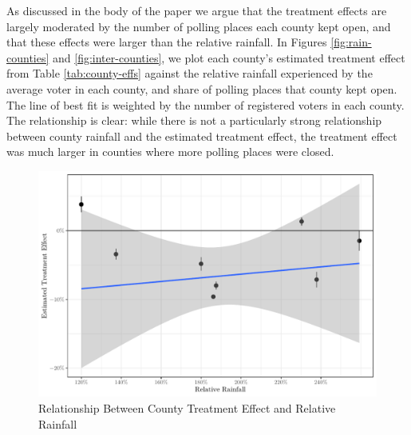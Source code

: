 \documentclass[
  12pt,
]{article}
\begin{document}
As discussed in the body of the paper we argue that the treatment effects are largely moderated by the number of polling places each county kept open, and that these effects were larger than the relative rainfall. In Figures \ref{fig:rain-counties} and \ref{fig:inter-counties}, we plot each county's estimated treatment effect from Table \ref{tab:county-effs} against the relative rainfall experienced by the average voter in each county, and share of polling places that county kept open. The line of best fit is weighted by the number of registered voters in each county. The relationship is clear: while there is not a particularly strong relationship between county rainfall and the estimated treatment effect, the treatment effect was much larger in counties where more polling places were closed.

\begin{figure}[H]

{\centering \includegraphics{si_files/figure-latex/rain-chunk-1} 

}

\caption{\label{fig:rain-counties}Relationship Between County Treatment Effect and Relative Rainfall}\label{fig:rain-chunk}
\end{figure}
\end{document}
